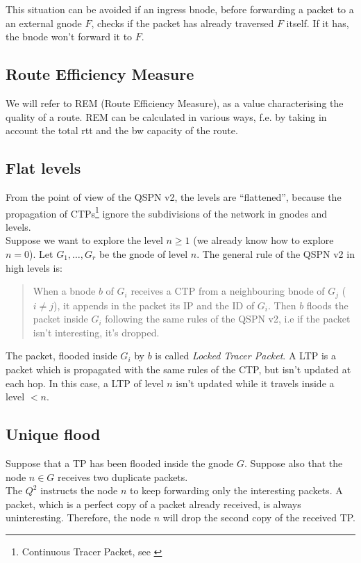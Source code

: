 \documentclass[a4paper]{article}
\begin{document}
This situation can be avoided if an ingress bnode, before forwarding a packet to a an
external gnode $F$, checks if the packet has already traversed $F$ itself. If
it has, the bnode won't forward it to $F$.

\subsection{Route Efficiency Measure}
We will refer to REM (Route Efficiency Measure), as a value characterising the
quality of a route. REM can be calculated in various ways, f.e. by taking in
account the total rtt and the bw capacity of the route. 

\subsection{Flat levels}
From the point of view of the QSPN v2, the levels are ``flattened'', because
the propagation of CTPs\footnote{Continuous Tracer Packet, see \cite{qspndoc}} ignore the subdivisions of
the network in gnodes and levels.\\

Suppose we want to explore the level $n\ge 1$ (we already know how to
explore $n=0$). Let $G_1,\dots, G_r$ be the gnode of level $n$. The general
rule of the QSPN v2 in high levels is: 
\begin{quote}
When a bnode $b$ of $G_i$ receives a CTP from a neighbouring bnode of $G_j$
($i\neq j$), it appends in the packet its IP and the ID of $G_i$. 
Then $b$ floods the packet inside $G_i$ following the same rules of the 
QSPN v2, i.e if the packet isn't interesting, it's dropped.
\end{quote}
The packet, flooded inside $G_i$ by $b$ is called \emph{Locked Tracer Packet}.
A LTP is a packet which is propagated with the same rules of the CTP, but
isn't updated at each hop. In this case, a LTP of level $n$ isn't updated
while it travels inside a level $<n$.

% 

\subsection{Unique flood}
Suppose that a TP has been flooded inside the gnode $G$.
Suppose also that the node $n \in G$ receives two duplicate packets.\\
The $Q^2$ instructs the node $n$ to keep forwarding only the interesting packets.
A packet, which is a perfect copy of a packet already received, is always
uninteresting. Therefore, the node $n$ will drop the second copy of the
received TP. 
\end{document}
